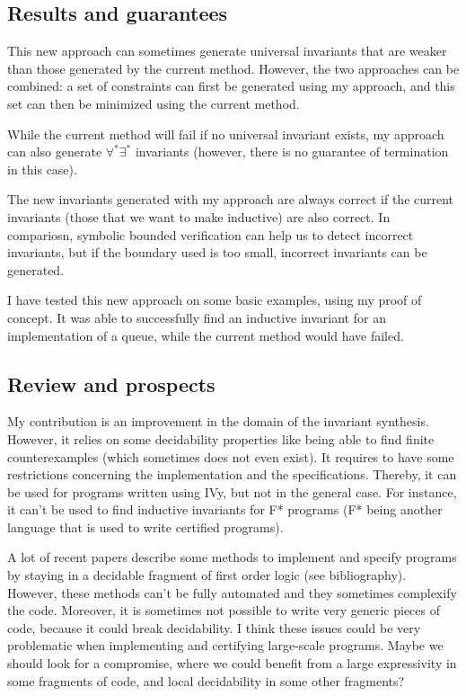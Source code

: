 \documentclass{article}
\newenvironment{point}[1]%
{\subsection*{#1}}%
{}
\begin{document}
\begin{point}{Results and guarantees}

  This new approach can sometimes generate universal invariants that are weaker than those generated by the current
  method. However, the two approaches can be combined: a set of constraints can first be generated using my approach,
  and this set can then be minimized using the current method.

  While the current method will fail if no universal invariant exists,
  my approach can also generate \(\forall^*\exists^*\) invariants (however, there is no guarantee of termination in this case).

  The new invariants generated with my approach are always correct if the current invariants (those that we want to make inductive)
  are also correct. In compariosn, symbolic bounded verification can help us to detect incorrect invariants, but if the boundary used is too small,
  incorrect invariants can be generated.

  I have tested this new approach on some basic examples, using my proof of concept.
  It was able to successfully find an inductive invariant for an implementation of a queue,
  while the current method would have failed.

\end{point}


\begin{point}{Review and prospects}

  My contribution is an improvement in the domain of the invariant synthesis.
  However, it relies on some decidability properties like being able to find finite counterexamples (which sometimes does not even exist).
  It requires to have some restrictions concerning the implementation and the specifications.
  Thereby, it can be used for programs written using IVy, but not in the general case.
  For instance, it can't be used to find inductive invariants for F* programs (F* being another language that is used to write certified programs).
  
  A lot of recent papers describe some methods to implement and specify programs by staying in a decidable fragment of first order logic (see bibliography).
  However, these methods can't be fully automated and they sometimes complexify the code. Moreover, it is sometimes not possible
  to write very generic pieces of code, because it could break decidability.
  I think these issues could be very problematic when implementing and certifying large-scale programs.
  Maybe we should look for a compromise, where we could benefit from a large expressivity in some fragments of code, and local decidability in some other fragments?

\end{point}
\end{document}
